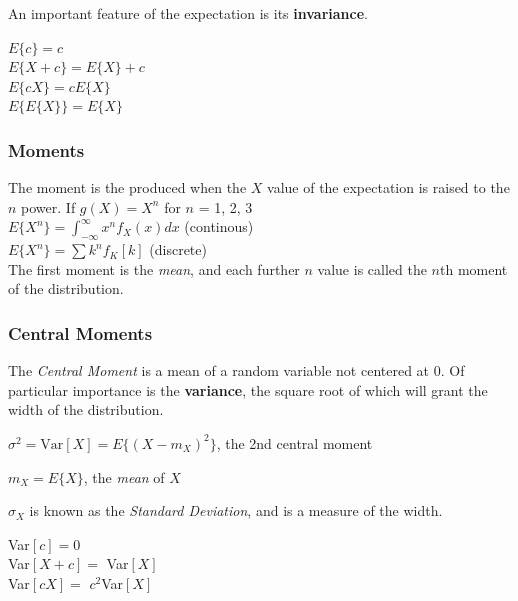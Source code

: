 \documentclass[11pt]{article}
\begin{document}
An important feature of the expectation is its \textbf{invariance}.

\begin{center}
    $E\{c\} = c$ \\
    
    $E\{X + c\} = E\{X\} + c$ \\
    
    $E\{cX\} = cE\{X\}$ \\
    
    $E\{E\{X\}\} = E\{X\}$
\end{center}

\subsubsection{Moments}

The moment is the produced when the $X$ value of the expectation is raised to the $n$ power. If $g(X) = X^n$ for $n$ = 1, 2, 3 \\

        $E\{X^n\} = \int_{-\infty}^{\infty}x^nf_X(x)dx$  (continous) \\

        $E\{X^n\} = \sum k^n f_K[k] $  (discrete) \\ 

The first moment is the \textit{mean}, and each further $n$ value is called the $n$th moment of the distribution.

\subsubsection{Central Moments}

The \textit{Central Moment} is a mean of a random variable not centered at 0. Of particular importance is the \textbf{variance}, the square root of which will grant the width of the distribution.

\begin{center}
    $\sigma^2 = \text{Var}[X] = E\{(X-m_X)^2\}$, the 2nd central moment \\
\end{center}

\begin{center}
    $m_X = E\{X\}$, the \textit{mean} of $X$ \\
\end{center}

$\sigma_X$ is known as the \textit{Standard Deviation}, and is a measure of the width.

\begin{center}
    Var$[c] = 0$ \\
    
    Var$[X + c] = $ Var$[X]$ \\
    
    Var$[cX] = $ $c^2$Var$[X]$
\end{center}
\end{document}
